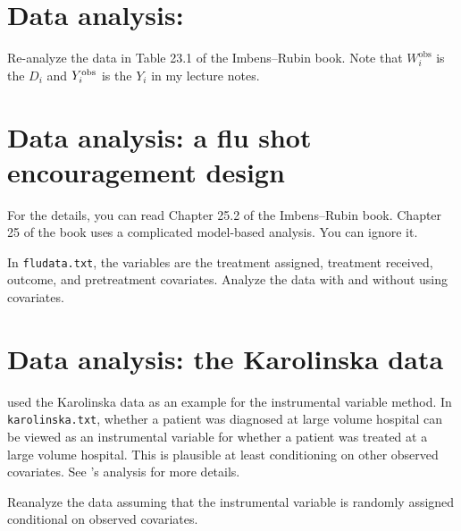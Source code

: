 \documentclass[11pt]{article}
\theoremstyle{definition}
\def\obs{\textnormal{obs}}
\begin{document}
\section{Data analysis: \citet{sommer1991estimating}}


Re-analyze the data in Table 23.1 of the Imbens--Rubin book. Note that $W_i^\text{obs}$ is the $D_i$ and $Y_i^\text{\obs}$ is the $Y_i$ in my lecture notes.


\section{Data analysis: a flu shot encouragement design \citep{mcdonald1992effects}}
For the details, you can read Chapter 25.2 of the Imbens--Rubin book. 
Chapter 25 of the book uses a complicated model-based analysis. You can ignore it.


In \texttt{fludata.txt}, the variables are the treatment assigned, treatment received, outcome, and pretreatment covariates. Analyze the data with and without using covariates. 

\section{Data analysis: the Karolinska data}


\citet{rubin2008objective} used the Karolinska data as an example for the instrumental variable method. In \texttt{karolinska.txt}, whether a patient was  diagnosed at large volume hospital can be viewed as an instrumental variable for whether a patient was treated at a large volume hospital. This is plausible at least conditioning on other observed covariates. See \citet{rubin2008objective}'s analysis for more details. 


Reanalyze the data assuming that the instrumental variable is randomly assigned conditional on observed covariates. 





\end{document}
